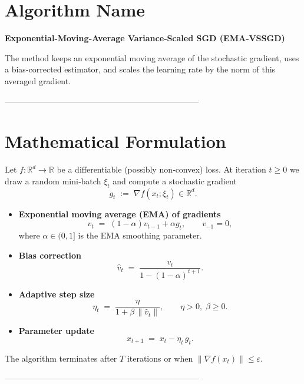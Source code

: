 \documentclass{article}
\newcommand{\R}{\mathbb{R}}
\newcommand{\norm}[1]{\left\|#1\right\|}
\newcommand{\grad}{\nabla}
\begin{document}
\section*{Algorithm Name}
\textbf{Exponential‑Moving‑Average Variance‑Scaled SGD (EMA‑VSSGD)}  

The method keeps an exponential moving average of the stochastic gradient, uses a bias‑corrected estimator, and scales the learning rate by the norm of this averaged gradient.

-----------------------------------------------------------------------

\section*{Mathematical Formulation}
Let $f:\R^{d}\rightarrow\R$ be a differentiable (possibly non‑convex) loss.  
At iteration $t\ge 0$ we draw a random mini‑batch $\xi_{t}$ and compute a stochastic gradient
\[
g_{t}\;:=\;\grad f(x_{t};\xi_{t})\in\R^{d}.
\]

\begin{itemize}
    \item \textbf{Exponential moving average (EMA) of gradients}
    \[
    v_{t}\;=\;(1-\alpha)v_{t-1}+\alpha g_{t},\qquad v_{-1}=0,
    \tag{1}
    \]
    where $\alpha\in(0,1]$ is the EMA smoothing parameter.
    \item \textbf{Bias correction}
    \[
    \hat v_{t}\;=\;\frac{v_{t}}{1-(1-\alpha)^{t+1}}.
    \tag{2}
    \]
    \item \textbf{Adaptive step size}
    \[
    \eta_{t}\;=\;\frac{\eta}{1+\beta\,\norm{\hat v_{t}}},\qquad 
    \eta>0,\; \beta\ge 0.
    \tag{3}
    \]
    \item \textbf{Parameter update}
    \[
    x_{t+1}\;=\;x_{t}-\eta_{t}\,g_{t}.
    \tag{4}
    \]
\end{itemize}

The algorithm terminates after $T$ iterations or when $\norm{\grad f(x_{t})}\le\varepsilon$.

-----------------------------------------------------------------------
\end{document}
